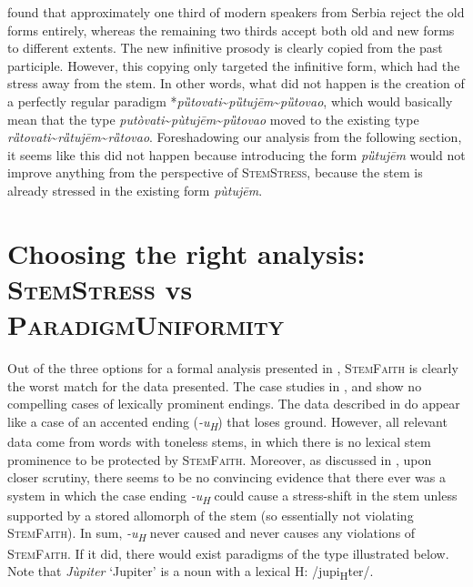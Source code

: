 \documentclass[output=paper,modfonts,nonflat
]{langsci/langscibook}
\begin{document}
\citet[]{Simonovic2015} found that approximately one third of modern speakers from Serbia reject the old forms entirely, whereas the remaining two thirds accept both old and new forms to different extents.
The new infinitive prosody is clearly copied from the past participle. However, this copying only targeted the infinitive form, which had the stress away from the stem. In other words, what did not happen is the creation of a perfectly regular paradigm *\textit{pȕtovati}\textasciitilde{}\textit{pȕtujēm}\textasciitilde{}\textit{pȕtovao}, which would basically mean that the type \textit{putòvati}\textasciitilde{}\textit{pùtujēm}\textasciitilde{}\textit{pȕtovao} moved to the existing type \textit{rȁtovati}\textasciitilde{}\textit{rȁtujēm}\textasciitilde{}\textit{rȁtovao}. Foreshadowing our analysis from the following section, it seems like this did not happen because introducing the form \textit{pȕtujēm} would not improve anything from the perspective of \textsc{StemStress}, because the stem is already stressed in the existing form \textit{pùtujēm}.

\section{Choosing the right analysis: \textsc{StemStress} vs \textsc{ParadigmUniformity}} \label{sec:kager:3}
Out of the three options for a formal analysis presented in , \textsc{StemFaith} is clearly the worst match for the data presented. The case studies in ,   and  show no compelling cases of lexically prominent endings. The data described in   do appear like a case of an accented ending (\textit{{-u}\textsubscript{H}}) that loses ground. However, all relevant data come from words with toneless stems, in which there is no lexical stem prominence to be protected by \textsc{StemFaith}. Moreover, as discussed in , upon closer scrutiny, there seems to be no convincing evidence that there ever was a system in which the case ending \textit{-u\textsubscript{H}} could cause a stress-shift in the stem unless supported by a stored allomorph of the stem (so essentially not violating \textsc{StemFaith}). In sum, \textit{-u\textsubscript{H}} never caused and never causes any violations of \textsc{StemFaith}. If it did, there would exist paradigms of the type illustrated below. Note that \textit{Jùpiter} `Jupiter' is a noun with a lexical H: /jupi\textsubscript{H}ter/. 
\end{document}
